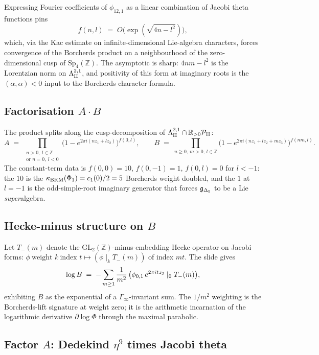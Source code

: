 Expressing Fourier coefficients of $\phi_{12,1}$ as a linear combination of
Jacobi theta functions pins
\[
  f(n, l) \;=\; O\!\big(\exp(\sqrt{4n - l^2})\big),
\]
which, via the Kac estimate on infinite-dimensional Lie-algebra characters,
forces convergence of the Borcherds product on a neighbourhood of the
zero-dimensional cusp of $\mathrm{Sp}_4(\mathbb{Z})$. The asymptotic is
sharp: $4nm - l^2$ is the Lorentzian norm on $\Lambda^{2,1}_{\mathrm{II}}$, and positivity of
this form at imaginary roots is the $(\alpha, \alpha) < 0$ input to the
Borcherds character formula.

\subsection*{Factorisation $A \cdot B$}

The product splits along the cusp-decomposition of $\Lambda^{2,1}_{\mathrm{II}} \cap \mathbb{R}_{>0}\mathcal{P}_{\mathrm{II}}$:
\[
  A \;=\; \prod_{\substack{n > 0,\ l \in \mathbb{Z} \\ \text{or } n = 0,\ l < 0}}
    \big(1 - e^{2\pi i(n z_1 + l z_2)}\big)^{f(0, l)}, \qquad
  B \;=\; \prod_{n \geq 0,\, m > 0,\, l \in \mathbb{Z}} \big(1 - e^{2\pi i(n z_1 + l z_2 + m z_3)}\big)^{f(nm, l)}.
\]
The constant-term data is $f(0, 0) = 10$, $f(0, -1) = 1$, $f(0, l) = 0$ for
$l < -1$: the $10$ is the $\kappa_{\mathrm{BKM}}(\Phi_1) = c_1(0)/2 = 5$ Borcherds weight doubled,
and the $1$ at $l = -1$ is the odd-simple-root imaginary generator that
forces $\mathfrak{g}_{\Delta_5}$ to be a Lie \emph{super}algebra.

\subsection*{Hecke-minus structure on $B$}

Let $T_-(m)$ denote the $\mathrm{GL}_2(\mathbb{Z})$-minus-embedding Hecke
operator on Jacobi forms: $\phi\ \text{weight }k\ \text{index }t \mapsto (\phi \mid_k T_-(m))$
of index $mt$. The slide gives
\[
  \log B \;=\; -\sum_{m \geq 1} \frac{1}{m^2}\,\big(\phi_{0,1}\, e^{2\pi i t z_3} \mid_0 T_-(m)\big),
\]
exhibiting $B$ as the exponential of a $\Gamma_\infty$-invariant sum. The
$1/m^2$ weighting is the Borcherds-lift signature at weight zero; it is the
arithmetic incarnation of the logarithmic derivative $\partial \log \Phi$
through the maximal parabolic.

\subsection*{Factor $A$: Dedekind $\eta^9$ times Jacobi theta}

